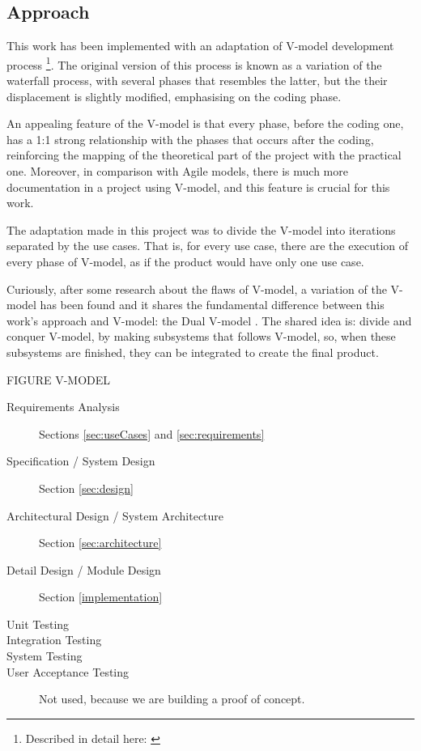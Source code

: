 \subsection{Approach}
This work has been implemented with an adaptation of V-model development process
\footnote{Described in detail here: \cite{mathur2010advancements}}.
The original version of this process is known as a variation of the waterfall process,
with several phases that resembles the latter,
but the their displacement is slightly modified,
emphasising on the coding phase.

An appealing feature of the V-model is that every phase,
before the coding one,
has a 1:1 strong relationship with the phases that occurs after the coding,
reinforcing the mapping of the theoretical part of the project with the practical one.
Moreover,
in comparison with Agile models,
there is much more documentation in a project using V-model,
and this feature is crucial for this work.

The adaptation made in this project was to divide the V-model into iterations separated by the use cases.
That is,
for every use case,
there are the execution of every phase of V-model,
as if the product would have only one use case.

Curiously,
after some research about the flaws of V-model,
a variation of the V-model has been found and it shares the fundamental difference between this work's approach and V-model:
the Dual V-model \cite{clark2009system}.
The shared idea is: divide and conquer V-model, 
by making subsystems that follows V-model,
so,
when these subsystems are finished,
they can be integrated to create the final product.


FIGURE V-MODEL

\begin{description}
    \item[Requirements Analysis] Sections \ref{sec:useCases} and \ref{sec:requirements}
    \item[Specification / System Design] Section \ref{sec:design}
    \item[Architectural Design / System Architecture] Section  \ref{sec:architecture}
    \item[Detail Design / Module Design] Section \ref{implementation}
    \item[Unit Testing] 
    \item[Integration Testing] 
    \item[System Testing] 
    \item[User Acceptance Testing] Not used, because we are building a proof of concept.
\end{description}


